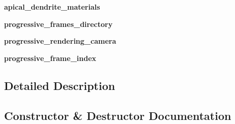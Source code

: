 \begin{DoxyCompactItemize}
\item 
{\bfseries apical\+\_\+dendrite\+\_\+materials}\hypertarget{classmeshy_1_1neuromorphovis_1_1builders_1_1skeleton_1_1skeleton__builder_1_1SkeletonBuilder_a96ffcce7aff0e0e6038e52c364501ff5}{}\label{classmeshy_1_1neuromorphovis_1_1builders_1_1skeleton_1_1skeleton__builder_1_1SkeletonBuilder_a96ffcce7aff0e0e6038e52c364501ff5}

\item 
{\bfseries progressive\+\_\+frames\+\_\+directory}\hypertarget{classmeshy_1_1neuromorphovis_1_1builders_1_1skeleton_1_1skeleton__builder_1_1SkeletonBuilder_ab134dc8cd4625f53a34a7e0902108106}{}\label{classmeshy_1_1neuromorphovis_1_1builders_1_1skeleton_1_1skeleton__builder_1_1SkeletonBuilder_ab134dc8cd4625f53a34a7e0902108106}

\item 
{\bfseries progressive\+\_\+rendering\+\_\+camera}\hypertarget{classmeshy_1_1neuromorphovis_1_1builders_1_1skeleton_1_1skeleton__builder_1_1SkeletonBuilder_a4d803f36ad391a887d2485d7ca9a97b5}{}\label{classmeshy_1_1neuromorphovis_1_1builders_1_1skeleton_1_1skeleton__builder_1_1SkeletonBuilder_a4d803f36ad391a887d2485d7ca9a97b5}

\item 
{\bfseries progressive\+\_\+frame\+\_\+index}\hypertarget{classmeshy_1_1neuromorphovis_1_1builders_1_1skeleton_1_1skeleton__builder_1_1SkeletonBuilder_ac3f91b45d367a3eff6430af2b43fff73}{}\label{classmeshy_1_1neuromorphovis_1_1builders_1_1skeleton_1_1skeleton__builder_1_1SkeletonBuilder_ac3f91b45d367a3eff6430af2b43fff73}

\end{DoxyCompactItemize}


\subsection{Detailed Description}


\subsection{Constructor \& Destructor Documentation}
